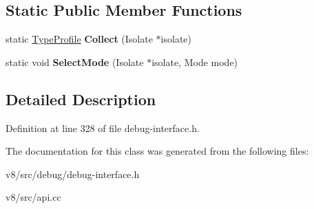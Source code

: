 \subsection*{Static Public Member Functions}
\begin{DoxyCompactItemize}
\item 
\mbox{\label{classv8_1_1debug_1_1TypeProfile_a44897edb06b7d219558dd594b0c6975c}} 
static \mbox{\hyperlink{classv8_1_1debug_1_1TypeProfile}{Type\+Profile}} {\bfseries Collect} (Isolate $\ast$isolate)
\item 
\mbox{\label{classv8_1_1debug_1_1TypeProfile_a800a8f23d2e2831ac7b13fb3dacf8291}} 
static void {\bfseries Select\+Mode} (Isolate $\ast$isolate, Mode mode)
\end{DoxyCompactItemize}


\subsection{Detailed Description}


Definition at line 328 of file debug-\/interface.\+h.



The documentation for this class was generated from the following files\+:\begin{DoxyCompactItemize}
\item 
v8/src/debug/debug-\/interface.\+h\item 
v8/src/api.\+cc\end{DoxyCompactItemize}
